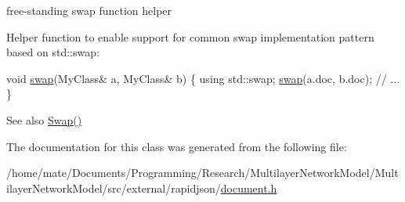 free-\/standing swap function helper 

Helper function to enable support for common swap implementation pattern based on {\ttfamily std\+::swap\+:} 
\begin{DoxyCode}
\textcolor{keywordtype}{void} \hyperlink{classGenericDocument_a0d63efcc43758ac3aed77e868233369d}{swap}(MyClass& a, MyClass& b) \{
    \textcolor{keyword}{using} std::swap;
    \hyperlink{classGenericDocument_a0d63efcc43758ac3aed77e868233369d}{swap}(a.doc, b.doc);
    \textcolor{comment}{// ...}
\}
\end{DoxyCode}
 \begin{DoxySeeAlso}{See also}
\hyperlink{classGenericDocument_a6290e1290fad74177625af5938c0c58f}{Swap()} 
\end{DoxySeeAlso}


The documentation for this class was generated from the following file\+:\begin{DoxyCompactItemize}
\item 
/home/mate/\+Documents/\+Programming/\+Research/\+Multilayer\+Network\+Model/\+Multilayer\+Network\+Model/src/external/rapidjson/\hyperlink{document_8h}{document.\+h}\end{DoxyCompactItemize}
